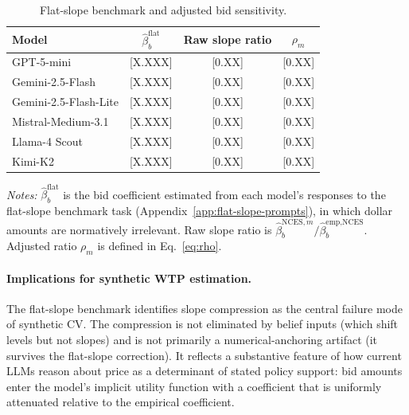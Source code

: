 \documentclass[12pt]{article}
\begin{document}
\begin{table}[h]
    \centering
    \caption{Flat-slope benchmark and adjusted bid sensitivity.}
    \label{tab:flat-slope}
    \begin{threeparttable}
    \begin{tabular}{lccc}
        \toprule
        Model & $\hat{\beta}_b^{\text{flat}}$ & Raw slope ratio & $\rho_m$ \\
        \midrule
        GPT-5-mini             & [X.XXX] & [0.XX] & [0.XX] \\
        Gemini-2.5-Flash       & [X.XXX] & [0.XX] & [0.XX] \\
        Gemini-2.5-Flash-Lite  & [X.XXX] & [0.XX] & [0.XX] \\
        Mistral-Medium-3.1     & [X.XXX] & [0.XX] & [0.XX] \\
        Llama-4 Scout          & [X.XXX] & [0.XX] & [0.XX] \\
        Kimi-K2                & [X.XXX] & [0.XX] & [0.XX] \\
        \bottomrule
    \end{tabular}
    \begin{tablenotes}\footnotesize
    \item \textit{Notes:} $\hat{\beta}_b^{\text{flat}}$ is the bid coefficient estimated from each model's responses to the flat-slope benchmark task (Appendix~\ref{app:flat-slope-prompts}), in which dollar amounts are normatively irrelevant. Raw slope ratio is $\hat{\beta}_b^{\text{NCES}, m} / \hat{\beta}_b^{\text{emp,NCES}}$. Adjusted ratio $\rho_m$ is defined in Eq.~\ref{eq:rho}.
    \end{tablenotes}
    \end{threeparttable}
\end{table}

\paragraph{Implications for synthetic WTP estimation.} The flat-slope benchmark identifies slope compression as the central failure mode of synthetic CV. The compression is not eliminated by belief inputs (which shift levels but not slopes) and is not primarily a numerical-anchoring artifact (it survives the flat-slope correction). It reflects a substantive feature of how current LLMs reason about price as a determinant of stated policy support: bid amounts enter the model's implicit utility function with a coefficient that is uniformly attenuated relative to the empirical coefficient.
\end{document}
